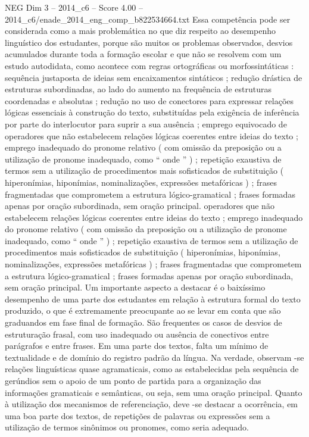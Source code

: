 \begin{textsample}{NEG Dim 3 – 2014\_c6 – Score 4.00 – 2014\_c6/enade\_2014\_eng\_comp\_b822534664.txt}
Essa competência pode ser considerada como a mais problemática no que diz respeito ao desempenho linguístico dos estudantes, porque são muitos os problemas observados, desvios acumulados durante toda a formação escolar e que não se resolvem com um estudo autodidata, como acontece com regras ortográficas ou morfossintáticas : sequência justaposta de ideias sem encaixamentos sintáticos ; redução drástica de estruturas subordinadas, ao lado do aumento na frequência de estruturas coordenadas e absolutas ; redução no uso de conectores para expressar relações lógicas essenciais à construção do texto, substituídas pela exigência de inferência por parte do interlocutor para suprir a sua ausência ; emprego equivocado de operadores que não estabelecem relações lógicas coerentes entre ideias do texto ; emprego inadequado do pronome relativo ( com omissão da preposição ou a utilização de pronome inadequado, como “ onde ” ) ; repetição exaustiva de termos sem a utilização de procedimentos mais sofisticados de substituição ( hiperonímias, hiponímias, nominalizações, expressões metafóricas ) ; frases fragmentadas que comprometem a estrutura lógico-gramatical ; frases formadas apenas por oração subordinada, sem oração principal. operadores que não estabelecem relações lógicas coerentes entre ideias do texto ; emprego inadequado do pronome relativo ( com omissão da preposição ou a utilização de pronome inadequado, como “ onde ” ) ; repetição exaustiva de termos sem a utilização de procedimentos mais sofisticados de substituição ( hiperonímias, hiponímias, nominalizações, expressões metafóricas ) ; frases fragmentadas que comprometem a estrutura lógico-gramatical ; frases formadas apenas por oração subordinada, sem oração principal.
Um importante aspecto a destacar é o baixíssimo desempenho de uma parte dos estudantes em relação à estrutura formal do texto produzido, o que é extremamente preocupante ao se levar em conta que são graduandos em fase final de formação.
São frequentes os casos de desvios de estruturação frasal, com uso inadequado ou ausência de conectivos entre parágrafos e entre frases.
Em uma parte dos textos, falta um mínimo de textualidade e de domínio do registro padrão da língua.
Na verdade, observam -se relações linguísticas quase agramaticais, como as estabelecidas pela sequência de gerúndios sem o apoio de um ponto de partida para a organização das informações gramaticais e semânticas, ou seja, sem uma oração principal.
Quanto à utilização dos mecanismos de referenciação, deve -se destacar a ocorrência, em uma boa parte dos textos, de repetições de palavras ou expressões sem a utilização de termos sinônimos ou pronomes, como seria adequado.

\end{textsample}
